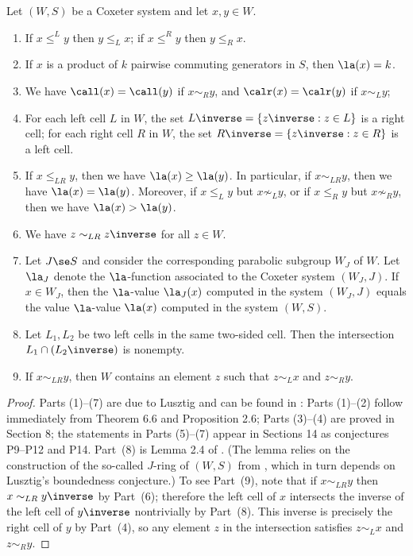 \begin{prop}
     \label{prop:Facts}
     Let $(W,S)$ be a Coxeter system and let $x,y\in W$.
     \begin{enumerate}
         \item If $x\le^L y$ then $y\le_L x$; if $x\le^R y $ then $y\le_R x$.
         \item If $x$ is a product of $k$ pairwise commuting generators in $S$, then $\la(x)=k$.
         \item We have $\call(x)=\call(y)$ if $x\sim_R y$, and $\calr(x)=\calr(y)$ if $x\sim_L y$;
         \item For each left cell $L$ in $W$, the set $L\inverse=\{z\inverse: z\in L\}$ is a right cell; for each
             right cell $R$ in $W$, the set $R\inverse=\{z\inverse:z\in R\}$ is a left cell. 
         \item If $x\le_{LR} y$, then we have $\la(x)\ge \la(y)$. In particular, if $x\sim_{LR}y$, then
             we have $\la(x)=\la(y)$. Moreover, if $x\le_L y$ but $x\not\sim_L y$, or if $x\le_R y$ but
             $x\not\sim_R y$, then we have $\la(x)>\la(y)$.
         \item We have $z\sim_{LR} z\inverse$ for all $z\in W$.
         \item Let $J\se S$ and consider the corresponding parabolic subgroup $W_J$ of $W$.
             Let $\la_J$ denote the $\la$-function associated to the Coxeter system $(W_J,J)$. If 
             $x\in W_J$, then
             the $\la$-value $\la_J(x)$ computed in the system $(W_J, J)$ equals the value
             $\la$-value $\la(x)$ computed in the system $(W,S)$.
         \item Let $L_1,L_2$ be two left cells in the same two-sided
             cell. Then the intersection $L_1\cap (L_2\inverse)$ is
             nonempty.
         \item If $x\sim_{LR}y$, then $W$ contains an element $z$ such that $z\sim_L x$ and $z\sim_R y$. 
     \end{enumerate}
        \end{prop}
        \begin{proof}
Parts (1)--(7) are due to Lusztig and can be found in \cite{LusztigHecke}: Parts (1)--(2) follow
immediately from Theorem 6.6 and Proposition 2.6; Parts (3)--(4) are proved in Section 8; the
statements in Parts (5)--(7) appear in Sections 14 as conjectures P9--P12 and P14.  Part~(8) is
Lemma 2.4 of \cite{BO}. (The lemma relies on the construction of the so-called $J$-ring of $(W,S)$
from \cite[\S 18]{LusztigHecke}, which in turn depends on Lusztig's boundedness conjecture.)  To see
Part~(9), note that if $x\sim_{LR} y$ then $x\sim_{LR} y\inverse$ by Part~(6); therefore the left
cell of $x$ intersects the inverse of the left cell of $y\inverse$ nontrivially by Part~(8).  This
inverse is precisely the right cell of $y$ by Part~(4), so any element $z$ in the intersection
satisfies $z\sim_L x$ and $z\sim_R y$.  
    \end{proof}

